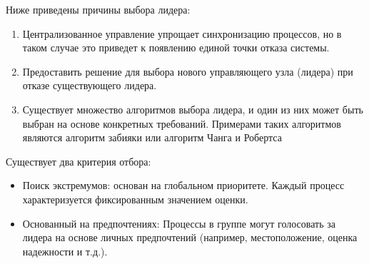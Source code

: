 Ниже приведены причины выбора лидера:
\begin{enumerate}
  \item Централизованное управление упрощает синхронизацию процессов, но в таком случае это приведет к появлению единой точки отказа системы.
  \item Предоставить решение для выбора нового управляющего узла (лидера) при отказе существующего лидера.
  \item Существует множество алгоритмов выбора лидера, и один из них может быть выбран на основе конкретных требований. Примерами таких алгоритмов являются алгоритм забияки или алгоритм Чанга и Робертса
\end{enumerate}

Существует два критерия отбора:
\begin{itemize}
  \item Поиск экстремумов: основан на глобальном приоритете. Каждый процесс характеризуется фиксированным значением оценки.
  \item Основанный на предпочтениях: Процессы в группе могут голосовать за лидера на основе личных предпочтений (например, местоположение, оценка надежности и т.д.).
\end{itemize}


